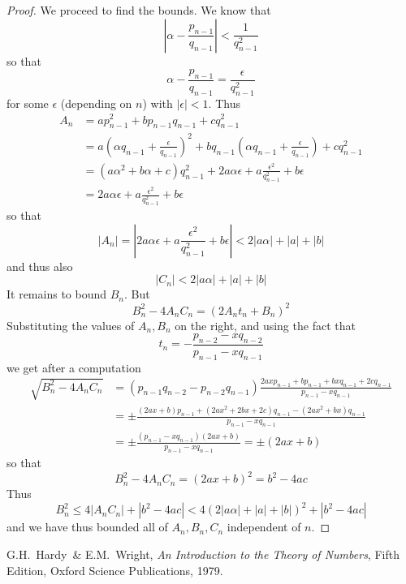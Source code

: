 \documentclass[12pt]{article}
\newcommand{\Abs}[1]{\left\lvert #1 \right\rvert}
\theoremstyle{definition}
\begin{document}
\begin{proof}
We proceed to find the bounds. We know that
\[\Abs{\alpha-\frac{p_{n-1}}{q_{n-1}}} < \frac{1}{q_{n-1}^2}\]
so that
\[\alpha-\frac{p_{n-1}}{q_{n-1}} = \frac{\epsilon}{q_{n-1}^2}\]
for some $\epsilon$ (depending on $n$) with $\Abs{\epsilon}<1$. Thus
\begin{align*}
A_n &= ap_{n-1}^2 + bp_{n-1}q_{n-1}+cq_{n-1}^2 \\
&= a\left(\alpha q_{n-1}+\frac{\epsilon}{q_{n-1}}\right)^2 + bq_{n-1}\left(\alpha q_{n-1}+\frac{\epsilon}{q_{n-1}}\right) + cq_{n-1}^2\\
&= (a\alpha^2+b\alpha+c)q_{n-1}^2 + 2a\alpha \epsilon + a\frac{\epsilon^2}{q_{n-1}^2}+b\epsilon\\
&= 2a\alpha \epsilon + a\frac{\epsilon^2}{q_{n-1}^2}+b\epsilon
\end{align*}
so that
\[\Abs{A_n} = \Abs{2a\alpha \epsilon + a\frac{\epsilon^2}{q_{n-1}^2}+b\epsilon} < 2\Abs{a\alpha}+\Abs{a}+\Abs{b}\]
and thus also 
\[\Abs{C_n} < 2\Abs{a\alpha}+\Abs{a}+\Abs{b}\]
It remains to bound $B_n$. But
\[B_n^2-4A_nC_n = (2A_nt_n+B_n)^2\]
Substituting the values of $A_n, B_n$ on the right, and using the fact that
\[t_n = -\frac{p_{n-2}-xq_{n-2}}{p_{n-1}-xq_{n-1}}\]
we get after a computation
\begin{align*}
\sqrt{B_n^2-4A_nC_n} &= (p_{n-1}q_{n-2}-p_{n-2}q_{n-1})\frac{2axp_{n-1}+bp_{n-1}+bxq_{n-1}+2cq_{n-1}}{p_{n-1}-xq_{n-1}}\\
&= \pm\frac{(2ax+b)p_{n-1}+(2ax^2+2bx+2c)q_{n-1}-(2ax^2+bx)q_{n-1}}{p_{n-1}-xq_{n-1}}\\
&= \pm\frac{(p_{n-1}-xq_{n-1})(2ax+b)}{p_{n-1}-xq_{n-1}} = \pm (2ax+b)
\end{align*}
so that
\[B_n^2-4A_nC_n = (2ax+b)^2 = b^2-4ac\]
Thus
\[B_n^2 \leq 4\Abs{A_nC_n}+\Abs{b^2-4ac} < 4(2\Abs{a\alpha}+\Abs{a}+\Abs{b})^2 + \Abs{b^2-4ac}\]
and we have thus bounded all of $A_n, B_n, C_n$ independent of $n$.
\end{proof}

\begin{thebibliography}{10}
G.H.~Hardy~\& E.M.~Wright, \emph{An Introduction to the Theory of Numbers}, Fifth Edition, Oxford Science Publications, 1979.
\end{thebibliography}

\end{document}
